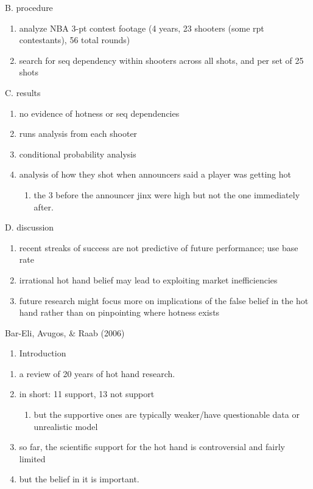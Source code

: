 \documentclass[12pt,twoside]{dukestatscithesis}
\providecommand{\tightlist}{%
  \setlength{\itemsep}{0pt}\setlength{\parskip}{0pt}}
\theoremstyle{definition}
\theoremstyle{definition}
\theoremstyle{definition}
\theoremstyle{remark}
\begin{document}
B. procedure
\begin{enumerate}
\def\labelenumi{\arabic{enumi}.}
\tightlist
\item
  analyze NBA 3-pt contest footage (4 years, 23 shooters (some rpt
  contestants), 56 total rounds)
\item
  search for seq dependency within shooters across all shots, and per
  set of 25 shots
\end{enumerate}
C. results
\begin{enumerate}
\def\labelenumi{\arabic{enumi}.}
\tightlist
\item
  no evidence of hotness or seq dependencies
\item
  runs analysis from each shooter
\item
  conditional probability analysis
\item
  analysis of how they shot when announcers said a player was getting
  hot
  \begin{enumerate}
  \def\labelenumii{\alph{enumii}.}
  \tightlist
  \item
    the 3 before the announcer jinx were high but not the one
    immediately after.
  \end{enumerate}
\end{enumerate}
D. discussion
\begin{enumerate}
\def\labelenumi{\arabic{enumi}.}
\tightlist
\item
  recent streaks of success are not predictive of future performance;
  use base rate
\item
  irrational hot hand belief may lead to exploiting market
  inefficiencies
\item
  future research might focus more on implications of the false belief
  in the hot hand rather than on pinpointing where hotness exists
\end{enumerate}
Bar-Eli, Avugos, \& Raab (2006)
\begin{enumerate}
\def\labelenumi{\Alph{enumi}.}
\tightlist
\item
  Introduction
\end{enumerate}
\begin{enumerate}
\def\labelenumi{\arabic{enumi}.}
\tightlist
\item
  a review of 20 years of hot hand research.
\item
  in short: 11 support, 13 not support
  \begin{enumerate}
  \def\labelenumii{\alph{enumii}.}
  \tightlist
  \item
    but the supportive ones are typically weaker/have questionable data
    or unrealistic model
  \end{enumerate}
\item
  so far, the scientific support for the hot hand is controversial and
  fairly limited
\item
  but the belief in it is important.
\end{enumerate}
\end{document}
